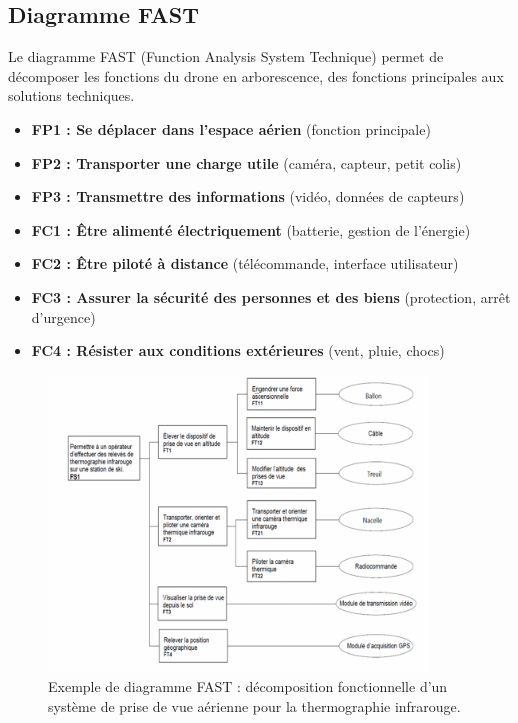 \documentclass[a4paper,12pt]{report}
\begin{document}
\subsection{Diagramme FAST}
Le diagramme FAST (Function Analysis System Technique) permet de décomposer les fonctions du drone en arborescence, des fonctions principales aux solutions techniques.

\begin{itemize}
    \item \textbf{FP1 : Se déplacer dans l'espace aérien} (fonction principale)
    \item \textbf{FP2 : Transporter une charge utile} (caméra, capteur, petit colis)
    \item \textbf{FP3 : Transmettre des informations} (vidéo, données de capteurs)
    \item \textbf{FC1 : Être alimenté électriquement} (batterie, gestion de l'énergie)
    \item \textbf{FC2 : Être piloté à distance} (télécommande, interface utilisateur)
    \item \textbf{FC3 : Assurer la sécurité des personnes et des biens} (protection, arrêt d'urgence)
    \item \textbf{FC4 : Résister aux conditions extérieures} (vent, pluie, chocs)
\end{itemize}

\begin{figure}[H]
    \centering
    \includegraphics[width=0.9\textwidth]{images/diagramme_fast_exemple.png}
    \caption{Exemple de diagramme FAST : décomposition fonctionnelle d'un système de prise de vue aérienne pour la thermographie infrarouge.}
    \label{fig:diagramme_fast_exemple}
\end{figure}
\end{document}
